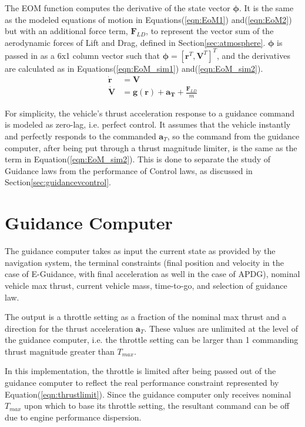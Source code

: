 The EOM function computes the derivative of the state vector $\bm{\phi}$. It is the same as the modeled equations of motion in Equations\:(\ref{eqn:EoM1}) and\:(\ref{eqn:EoM2}) but with an additional force term, $\bm{F}_{LD}$, to represent the vector sum of the aerodynamic forces of Lift and Drag, defined in Section\:\ref{sec:atmosphere}. $\bm{\phi}$ is passed in as a 6x1 column vector such that $\bm{\phi} = [\bm{r}^T,\bm{V}^T]^T$, and the derivatives are calculated as in Equations\:(\ref{eqn:EoM_sim1}) and\:(\ref{eqn:EoM_sim2}).
\begin{align}
\label{eqn:EoM_sim1}
\bm{\dot{r}} &= \bm{V}\\
\label{eqn:EoM_sim2}
\bm{\dot{V}} &= \bm{g(r)} + \bm{a_T} + \frac{\bm{F}_{LD}}{m}
\end{align}

For simplicity, the vehicle's thrust acceleration response to a guidance command is modeled as zero-lag, i.e. perfect control. It assumes that the vehicle instantly and perfectly responds to the commanded $\bm{a}_T$, so the command from the guidance computer, after being put through a thrust magnitude limiter, is the same as the term in Equation\:(\ref{eqn:EoM_sim2}). This is done to separate the study of Guidance laws from the performance of Control laws, as discussed in Section\:\ref{sec:guidancevcontrol}.

\section{Guidance Computer} \label{sec:guidancecomp}
The guidance computer takes as input the current state as provided by the navigation system, the terminal constraints (final position and velocity in the case of E-Guidance, with final acceleration as well in the case of APDG), nominal vehicle max thrust, current vehicle mass, time-to-go, and selection of guidance law.

The output is a throttle setting as a fraction of the nominal max thrust and a direction for the thrust acceleration $\bm{a}_T$. These values are unlimited at the level of the guidance computer, i.e. the throttle setting can be larger than 1 commanding thrust magnitude greater than $T_{max}$. 

In this implementation, the throttle is limited after being passed out of the guidance computer to reflect the real performance constraint represented by Equation\:(\ref{eqn:thrustlimit}). Since the guidance computer only receives nominal $T_{max}$ upon which to base its throttle setting, the resultant command can be off due to engine performance dispersion.

